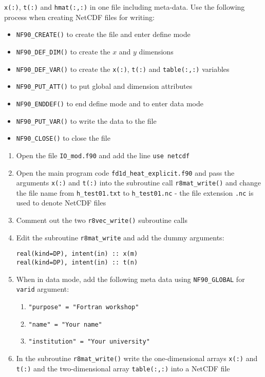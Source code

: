 \documentclass[12pt]{article}
\begin{document}
\begin{enumerate}
  \texttt{x(:)}, \texttt{t(:)} and \texttt{hmat(:,:)} in one file including meta-data. Use
  the following process when creating NetCDF files for writing:
\begin{itemize}
\item\texttt{NF90\_CREATE()} to create the file and enter define mode
\item\texttt{NF90\_DEF\_DIM()} to create the $x$ and $y$ dimensions
\item\texttt{NF90\_DEF\_VAR()} to create the \texttt{x(:)}, \texttt{t(:)} and
\texttt{table(:,:)} variables
\item\texttt{NF90\_PUT\_ATT()} to put global and dimension attributes
\item\texttt{NF90\_ENDDEF()} to end define mode and to enter data mode
\item\texttt{NF90\_PUT\_VAR()} to write the data to the file
\item\texttt{NF90\_CLOSE()} to close the file
\end{itemize}
\begin{enumerate}
\item Open the file \texttt{IO\_mod.f90} and add the line \texttt{use netcdf}
\item Open the main program code \texttt{fd1d\_heat\_explicit.f90} and pass the arguments \texttt{x(:)} and
  \texttt{t(:)} into the subroutine call \texttt{r8mat\_write()} and change the file name from \texttt{h\_test01.txt}
  to \texttt{h\_test01.nc} - the file extension \texttt{.nc} is used to denote NetCDF files
\item Comment out the two \texttt{r8vec\_write()} subroutine calls
\item Edit the subroutine \texttt{r8mat\_write} and add the dummy arguments:
\begin{verbatim}
real(kind=DP), intent(in) :: x(m)
real(kind=DP), intent(in) :: t(n)
\end{verbatim}
\item When in data mode, add the following meta data using \texttt{NF90\_GLOBAL} for \texttt{varid} argument:
  \begin{enumerate}
  \item\texttt{"purpose" = "Fortran workshop"}
  \item\texttt{"name" = "Your name"}
  \item\texttt{"institution" = "Your university"} 
  \end{enumerate}
\item In the subroutine \texttt{r8mat\_write()} write the one-dimensional arrays \texttt{x(:)} and \texttt{t(:)} and the two-dimensional array \texttt{table(:,:)} into a NetCDF file

\end{enumerate}
\end{enumerate}
\end{document}
